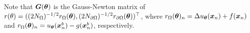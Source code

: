 
Note that ${\bm{G}}({\bm{\theta}})$ is the Gauss-Newton matrix of $r(\theta) = ((2N_\Omega)^{-1/2}r_\Omega({\bm{\theta}}), (2N_{\partial\Omega})^{-1/2} r_{\partial\Omega}({\bm{\theta}}))^\top$,
where $r_{\Omega}({\bm{\theta}})_n = \Delta u_{\bm{\theta}}({\bm{x}}_n) + f({\bm{x}}_n)$ and $r_{\Omega}({\bm{\theta}})_n = u_{\bm{\theta}}({\bm{x}}_n^b) - g({\bm{x}}_n^b)$, respectively.

